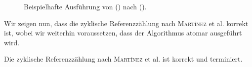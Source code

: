\begin{figure}[h]
	\centering
	\begin{subfigure}{0.4\textwidth}
		\centering
		
	\end{subfigure}~\hspace{0.5cm}~
	\begin{subfigure}{0.4\textwidth}
		\centering
		
	\end{subfigure}\\[1cm]
	\begin{subfigure}{0.4\textwidth}
		\centering
		
	\end{subfigure}~\hspace{0.5cm}~
	\begin{subfigure}{0.4\textwidth}
		\centering
		
	\end{subfigure}\\[1cm]
	\begin{subfigure}{0.4\textwidth}
		\centering
		
	\end{subfigure}~\hspace{0.5cm}~
	\begin{subfigure}{0.4\textwidth}
		\centering
		
	\end{subfigure}
	\caption[Ausführung von ()]{Beispielhafte Ausführung von () nach ().}
	\label{fig:rc-unmark-example}
\end{figure}

Wir zeigen nun, dass die zyklische Referenzzählung nach \textsc{Martínez} et al. korrekt ist, wobei wir weiterhin voraussetzen, dass der Algorithmus atomar ausgeführt wird.

\begin{mybox}
\begin{satz}
\label{satz:cyclic-rc-correctness}
	Die zyklische Referenzzählung nach \textsc{Martínez} et al. ist korrekt und terminiert.
\end{satz}
\end{mybox}

